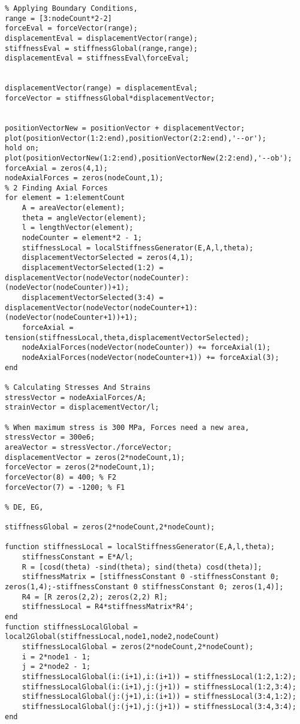 \documentclass{article}
\begin{document}
\begin{verbatim}
% Applying Boundary Conditions,
range = [3:nodeCount*2-2]
forceEval = forceVector(range);
displacementEval = displacementVector(range);
stiffnessEval = stiffnessGlobal(range,range);
displacementEval = stiffnessEval\forceEval;


displacementVector(range) = displacementEval;
forceVector = stiffnessGlobal*displacementVector;


positionVectorNew = positionVector + displacementVector;
plot(positionVector(1:2:end),positionVector(2:2:end),'--or');
hold on;
plot(positionVectorNew(1:2:end),positionVectorNew(2:2:end),'--ob');
forceAxial = zeros(4,1);
nodeAxialForces = zeros(nodeCount,1);
% 2 Finding Axial Forces
for element = 1:elementCount
    A = areaVector(element);
    theta = angleVector(element);
    l = lengthVector(element);
    nodeCounter = element*2 - 1;
    stiffnessLocal = localStiffnessGenerator(E,A,l,theta);
    displacementVectorSelected = zeros(4,1);
    displacementVectorSelected(1:2) = displacementVector(nodeVector(nodeCounter):(nodeVector(nodeCounter))+1);
    displacementVectorSelected(3:4) = displacementVector(nodeVector(nodeCounter+1):(nodeVector(nodeCounter+1))+1);
    forceAxial = tension(stiffnessLocal,theta,displacementVectorSelected);
    nodeAxialForces(nodeVector(nodeCounter)) += forceAxial(1);
    nodeAxialForces(nodeVector(nodeCounter+1)) += forceAxial(3);
end

% Calculating Stresses And Strains
stressVector = nodeAxialForces/A;
strainVector = displacementVector/l;

% When maximum stress is 300 MPa, Forces need a new area,
stressVector = 300e6;
areaVector = stressVector./forceVector;
displacementVector = zeros(2*nodeCount,1);
forceVector = zeros(2*nodeCount,1);
forceVector(8) = 400; % F2
forceVector(7) = -1200; % F1

% DE, EG,

stiffnessGlobal = zeros(2*nodeCount,2*nodeCount);

function stiffnessLocal = localStiffnessGenerator(E,A,l,theta);
    stiffnessConstant = E*A/l;
    R = [cosd(theta) -sind(theta); sind(theta) cosd(theta)];
    stiffnessMatrix = [stiffnessConstant 0 -stiffnessConstant 0; zeros(1,4);-stiffnessConstant 0 stiffnessConstant 0; zeros(1,4)];
    R4 = [R zeros(2,2); zeros(2,2) R];
    stiffnessLocal = R4*stiffnessMatrix*R4';
end
function stiffnessLocalGlobal = local2Global(stiffnessLocal,node1,node2,nodeCount)
    stiffnessLocalGlobal = zeros(2*nodeCount,2*nodeCount);
    i = 2*node1 - 1;
    j = 2*node2 - 1;
    stiffnessLocalGlobal(i:(i+1),i:(i+1)) = stiffnessLocal(1:2,1:2);
    stiffnessLocalGlobal(i:(i+1),j:(j+1)) = stiffnessLocal(1:2,3:4);
    stiffnessLocalGlobal(j:(j+1),i:(i+1)) = stiffnessLocal(3:4,1:2);
    stiffnessLocalGlobal(j:(j+1),j:(j+1)) = stiffnessLocal(3:4,3:4);
end


\end{verbatim}
\end{document}
